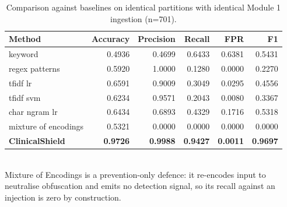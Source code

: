 \begin{table}[htbp]
\centering
\caption{Comparison against baselines on identical partitions with identical Module 1 ingestion (n=701).}
\label{tab:baselines}
\begin{tabular}{lrrrrr}
\hline
Method & Accuracy & Precision & Recall & FPR & F1 \\
\hline
keyword & 0.4936 & 0.4699 & 0.6433 & 0.6381 & 0.5431 \\
regex patterns & 0.5920 & 1.0000 & 0.1280 & 0.0000 & 0.2270 \\
tfidf lr & 0.6591 & 0.9009 & 0.3049 & 0.0295 & 0.4556 \\
tfidf svm & 0.6234 & 0.9571 & 0.2043 & 0.0080 & 0.3367 \\
char ngram lr & 0.6434 & 0.6893 & 0.4329 & 0.1716 & 0.5318 \\
mixture of encodings & 0.5321 & 0.0000 & 0.0000 & 0.0000 & 0.0000 \\
\textbf{ClinicalShield} & \textbf{0.9726} & \textbf{0.9988} & \textbf{0.9427} & \textbf{0.0011} & \textbf{0.9697} \\
\hline
\end{tabular}
\\[2pt]\footnotesize{Mixture of Encodings is a prevention-only defence: it re-encodes input to neutralise obfuscation and emits no detection signal, so its recall against an injection is zero by construction.}
\end{table}

